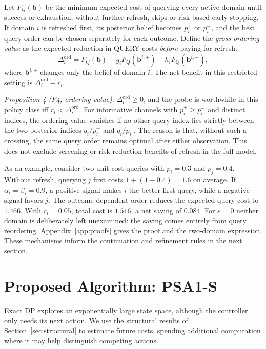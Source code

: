 \documentclass[conference]{IEEEtran}
\begin{document}
Let $F_Q(\mathbf b)$ be the minimum expected cost of querying every active domain until success or exhaustion, without further refresh, skips or risk-based early stopping. If domain $i$ is refreshed first, its posterior belief becomes $p_i^+$ or $p_i^-$, and the best query order can be chosen separately for each outcome. Define the \emph{gross ordering value} as the expected reduction in QUERY costs \emph{before} paying for refresh:
\begin{equation}
 \Delta_i^{\mathrm{ord}}=F_Q(\mathbf b)-
 g_iF_Q(\mathbf b^{i,+})-h_iF_Q(\mathbf b^{i,-}),
 \label{eq:voi}
\end{equation}
where $\mathbf b^{i,\pm}$ changes only the belief of domain $i$. The net benefit in this restricted setting is $\Delta_i^{\mathrm{ord}}-r_i$.

\textit{Proposition 4 (P4, ordering value).} $\Delta_i^{\mathrm{ord}}\ge0$, and the probe is worthwhile in this policy class iff $r_i<\Delta_i^{\mathrm{ord}}$. For informative channels with $p_i^+\ge p_i^-$ and distinct indices, the ordering value vanishes if no other query index lies strictly between the two posterior indices $q_i/p_i^+$ and $q_i/p_i^-$. The reason is that, without such a crossing, the same query order remains optimal after either observation. This does not exclude screening or risk-reduction benefits of refresh in the full model.

As an example, consider two unit-cost queries with $p_i=0.3$ and $p_j=0.4$. Without refresh, querying $j$ first costs $1+(1-0.4)=1.6$ on average. If $\alpha_i=\beta_i=0.9$, a positive signal makes $i$ the better first query, while a negative signal favors $j$. The outcome-dependent order reduces the expected query cost to $1.466$. With $r_i=0.05$, total cost is $1.516$, a net saving of $0.084$. For $\varepsilon=0$ neither domain is deliberately left unexamined: the saving comes entirely from query reordering. Appendix~\ref{app:proofs} gives the proof and the two-domain expression. These mechanisms inform the continuation and refinement rules in the next section.

\section{Proposed Algorithm: PSA1-S}
\label{sec:algorithms}
Exact DP explores an exponentially large state space, although the controller only needs its next action. We use the structural results of Section~\ref{sec:structural} to estimate future costs, spending additional computation where it may help distinguish competing actions.
\end{document}
